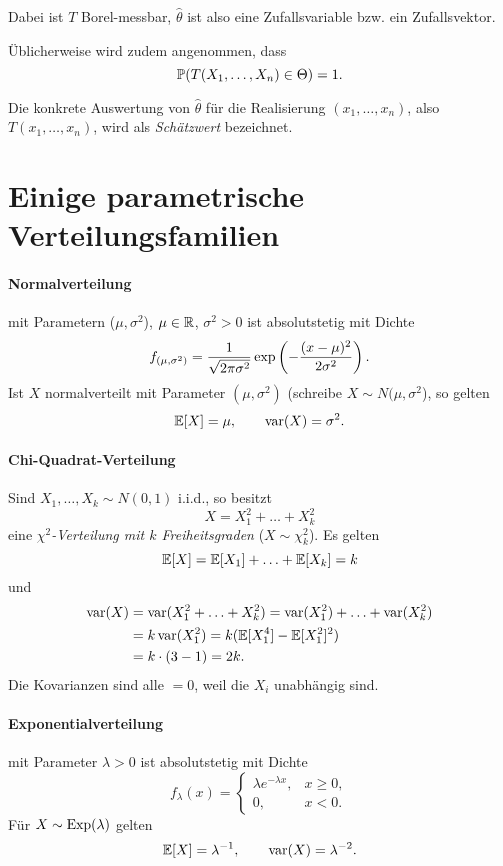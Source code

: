 Dabei ist $T$ Borel-messbar, $\hat{\theta}$ ist also eine Zufallsvariable bzw.
ein Zufallsvektor.

Üblicherweise wird zudem angenommen, dass
\[ \mathbb{P}( T(X_1, \ldots, X_n) \in \Theta ) = 1. \]

Die konkrete Auswertung von $\hat{\theta}$ für die Realisierung $(x_1, \ldots,
x_n)$, also $T(x_1, \ldots, x_n)$, wird als \emph{Schätzwert} bezeichnet.

\section{Einige parametrische Verteilungsfamilien}
\paragraph{Normalverteilung}
mit Parametern ($\mu, \sigma^2$), $\mu \in \mathbb{R}$, $\sigma^2 > 0$ ist
absolutstetig mit Dichte 
\[ f_{(\mu,\sigma^2)} = \frac{1}{\sqrt{2 \pi \sigma^2}} \exp \left( -
    \frac{(x-\mu)^2}{2 \sigma^2} \right). \]
Ist $X$ normalverteilt mit Parameter $(\mu,\sigma^2)$ (schreibe $X \sim N(\mu,
\sigma^2$), so gelten
\[ \mathbb{E}[X] = \mu, \qquad \operatorname{var}(X) = \sigma^2. \]

\paragraph{Chi-Quadrat-Verteilung}
Sind $X_1, \ldots, X_k \sim N(0,1)$ i.i.d., so besitzt
\[ X = X_1^2 + \ldots + X_k^2 \]
eine \emph{$\chi^2$-Verteilung mit $k$ Freiheitsgraden} ($X \sim \chi_k^2$). Es
gelten
\[ \mathbb{E}[X] = \mathbb{E}[X_1] + \ldots + \mathbb{E}[X_k] = k \]
und
\[ \begin{aligned}
    \operatorname{var}(X)
    &= \operatorname{var}(X_1^2 + \ldots + X_k^2) = \operatorname{var}(X_1^2) + \ldots + \operatorname{var}(X_k^2) \\
    &= k \operatorname{var}(X_1^2) = k( \mathbb{E}[X_1^4] - \mathbb{E}[X_1^2]^2 ) \\
    &= k \cdot (3-1) = 2k.
  \end{aligned} \]
Die Kovarianzen sind alle $=0$, weil die $X_i$ unabhängig sind.

\paragraph{Exponentialverteilung}
mit Parameter $\lambda > 0$ ist absolutstetig mit Dichte
\[ f_{\lambda} (x) = \begin{cases}
    \lambda e^{-\lambda x}, & x \ge 0, \\
    0, & x < 0.
  \end{cases} \]
Für $X \sim \operatorname*{Exp}(\lambda)$ gelten
\[ \mathbb{E}[X] = \lambda^{-1}, \qquad \operatorname{var}(X) = \lambda^{-2}. \]

